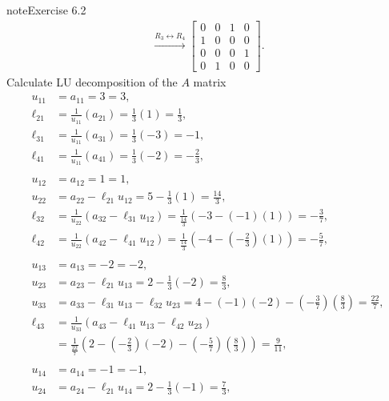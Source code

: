 \documentclass[letterpaper,10pt,english]{jupyterBook}
\begin{document}
\begin{sphinxadmonition}{note}{Exercise 6.2}
\begin{align*}
    \xrightarrow{R_{3} \leftrightarrow R_{4}}
    \left[\begin{matrix}0 & 0 & 1 & 0\\1 & 0 & 0 & 0\\0 & 0 & 0 & 1\\0 & 1 & 0 & 0\end{matrix}\right]
.
\end{align*}
\sphinxAtStartPar
Calculate LU decomposition of the \(A\) matrix
\begin{align*}
    u_{11} &= a_{11} = 3 = 3, \\
    \ell_{21} &= \frac{1}{u_{11}}\left(a_{21}\right) = \frac{1}{3}\left(1\right) = \frac{1}{3}, \\
    \ell_{31} &= \frac{1}{u_{11}}\left(a_{31}\right) = \frac{1}{3}\left(-3\right) = -1, \\
    \ell_{41} &= \frac{1}{u_{11}}\left(a_{41}\right) = \frac{1}{3}\left(-2\right) = - \frac{2}{3}, \\
    \\
    u_{12} &= a_{12} = 1 = 1, \\
    u_{22} &= a_{22} - \ell_{21} u_{12} = 5 - \frac{1}{3}\left(1\right) = \frac{14}{3}, \\
    \ell_{32} &= \frac{1}{u_{22}}\left(a_{32} - \ell_{31} u_{12}\right) = \frac{1}{\frac{14}{3}}\left(-3 - \left(-1\right)\left(1\right)\right) = - \frac{3}{7}, \\
    \ell_{42} &= \frac{1}{u_{22}}\left(a_{42} - \ell_{41} u_{12}\right) = \frac{1}{\frac{14}{3}}\left(-4 - \left(- \frac{2}{3}\right)\left(1\right)\right) = - \frac{5}{7}, \\
    \\
    u_{13} &= a_{13} = -2 = -2, \\
    u_{23} &= a_{23} - \ell_{21} u_{13} = 2 - \frac{1}{3}\left(-2\right) = \frac{8}{3}, \\
    u_{33} &= a_{33} - \ell_{31} u_{13} - \ell_{32} u_{23} = 4 - \left(-1\right)\left(-2\right) - \left(- \frac{3}{7}\right)\left(\frac{8}{3}\right) = \frac{22}{7}, \\
    \ell_{43} &= \frac{1}{u_{33}}\left(a_{43} - \ell_{41} u_{13} - \ell_{42} u_{23}\right) \\
    &= \frac{1}{\frac{22}{7}}\left(2 - \left(- \frac{2}{3}\right)\left(-2\right) - \left(- \frac{5}{7}\right)\left(\frac{8}{3}\right)\right) = \frac{9}{11}, \\
    \\
    u_{14} &= a_{14} = -1 = -1, \\
    u_{24} &= a_{24} - \ell_{21} u_{14} = 2 - \frac{1}{3}\left(-1\right) = \frac{7}{3}, \\

\end{align*}
\end{sphinxadmonition}
\end{document}
